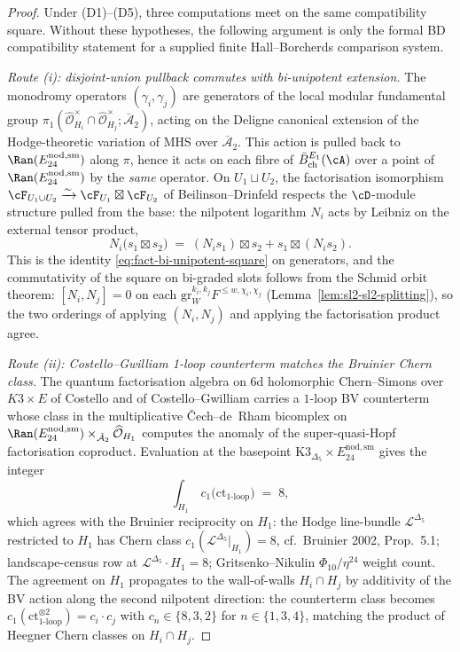 \begin{proof}
Under \textup{(D1)--(D5)}, three computations meet on the same
compatibility square. Without these hypotheses, the following argument
is only the formal BD compatibility statement for a supplied finite
Hall--Borcherds comparison system.

\emph{Route (i): disjoint-union pullback commutes with bi-unipotent
extension.} The monodromy operators $(\gamma_i,\gamma_j)$ are generators
of the local modular fundamental group $\pi_1(\widehat{\mathcal O}^\times_{H_i}
\cap\widehat{\mathcal O}^\times_{H_j};\bar{\mathcal A}_2)$, acting on the
Deligne canonical extension of the Hodge-theoretic variation of MHS over
$\overline{\mathcal A}_2$. This action is pulled back to
$\Ran(E^{\mathrm{nod,sm}}_{24})$ along $\pi$, hence it acts on each fibre of
$\bar B^{E_1}_{\mathrm{ch}}(\cA)$ over a point of
$\Ran(E^{\mathrm{nod,sm}}_{24})$ by the \emph{same} operator. On
$U_1\sqcup U_2$, the factorisation isomorphism
$\cF_{U_1\cup U_2}\xrightarrow{\sim}\cF_{U_1}\boxtimes\cF_{U_2}$ of
Beilinson--Drinfeld \cite[\S 3.4.4]{BD04} respects the $\cD$-module
structure pulled from the base: the nilpotent logarithm $N_i$ acts by
Leibniz on the external tensor product,
\[
N_i\bigl(s_1\boxtimes s_2\bigr)
\;=\;
(N_i s_1)\boxtimes s_2 + s_1\boxtimes(N_i s_2).
\]
This is the identity \eqref{eq:fact-bi-unipotent-square} on generators,
and the commutativity of the square on bi-graded slots follows from the
Schmid orbit theorem: $[N_i,N_j]=0$ on each
$\mathrm{gr}^{k_i,k_j}_{W}F^{\leq w,\chi_i,\chi_j}$
(Lemma~\textup{\ref{lem:sl2-sl2-splitting}}), so the two orderings of
applying $(N_i,N_j)$ and applying the factorisation product agree.

\emph{Route (ii): Costello--Gwilliam 1-loop counterterm matches the
Bruinier Chern class.} The quantum factorisation algebra on $6$d
holomorphic Chern--Simons over $K3\times E$ of Costello
\cite{Costello2021hCS} and of Costello--Gwilliam \cite[Ch.~6--8]{CG17}
carries a $1$-loop BV counterterm whose class in the multiplicative
Čech--de~Rham bicomplex on
$\Ran(E^{\mathrm{nod,sm}}_{24})\times_{\bar{\mathcal A}_2}
\widehat{\mathcal O}_{H_1}$ computes the anomaly of the super-quasi-Hopf
factorisation coproduct. Evaluation at the basepoint
$\mathrm{K3}_{\Delta_5}\times E^{\mathrm{nod,sm}}_{24}$ gives the integer
\[
\int_{H_1}\, c_1\bigl(\mathrm{ct}_{1\text{-}\mathrm{loop}}\bigr)
\;=\;
8,
\]
which agrees with the Bruinier reciprocity on $H_1$: the Hodge
line-bundle $\mathcal L^{\Delta_5}$ restricted to $H_1$ has Chern class
$c_1(\mathcal L^{\Delta_5}|_{H_1})=8$, cf.\ Bruinier 2002, Prop.~5.1;
landscape-census row \cite[§ Humbert reciprocity]{landscape_census_tex}
at $\mathcal L^{\Delta_5}\cdot H_1=8$; Gritsenko--Nikulin
\cite{GritsenkoNikulin1997} $\Phi_{10}/\eta^{24}$ weight count. The
agreement on $H_1$ propagates to the wall-of-walls $H_i\cap H_j$ by
additivity of the BV action along the second nilpotent direction: the
counterterm class becomes
$c_1(\mathrm{ct}^{\otimes 2}_{1\text{-}\mathrm{loop}})=c_i\cdot c_j$ with
$c_n\in\{8,3,2\}$ for $n\in\{1,3,4\}$, matching the product of Heegner
Chern classes on $H_i\cap H_j$.


\end{proof}
